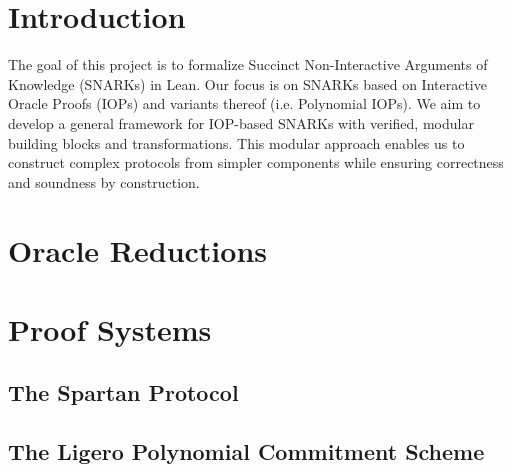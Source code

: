 %

\chapter{Introduction}

The goal of this project is to formalize Succinct Non-Interactive Arguments of Knowledge (SNARKs) in
Lean. Our focus is on SNARKs based on Interactive Oracle Proofs (IOPs) and variants thereof (i.e.
Polynomial IOPs). We aim to develop a general framework for IOP-based SNARKs with verified, modular
building blocks and transformations. This modular approach enables us to construct complex protocols
from simpler components while ensuring correctness and soundness by construction.

\chapter{Oracle Reductions}\label{chap:oracle_reductions}





\chapter{Proof Systems}\label{chap:proof_systems}







\section{The Spartan Protocol}

\section{The Ligero Polynomial Commitment Scheme}

